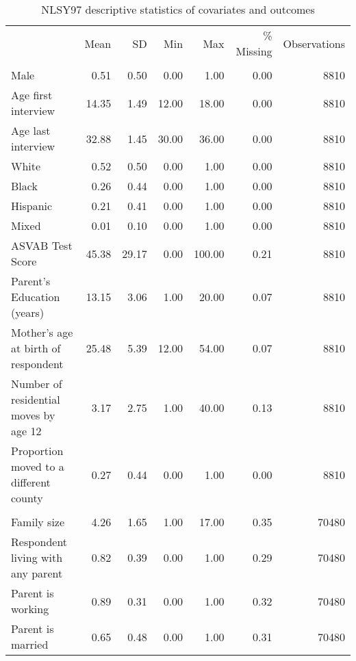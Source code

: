 \begin{table}[htp]
\scriptsize
\setlength{\tabcolsep}{10pt}
\renewcommand{\arraystretch}{0.8}
\begin{threeparttable}
\centering
\caption{NLSY97 descriptive statistics of covariates and outcomes} 
\label{tab:nlsy97_descriptives}
\begin{tabular}{lrrrrrr}
  \hline
\addlinespace
& Mean & SD & Min & Max & \% Missing & Observations \\
\addlinespace
 \hline
  \addlinespace
\multicolumn{7}{l}{\textit{Time-invariant covariates}} \\
\addlinespace
\quad Male & 0.51 & 0.50 & 0.00 & 1.00 & 0.00 & 8810 \\ 
  \quad Age first interview & 14.35 & 1.49 & 12.00 & 18.00 & 0.00 & 8810 \\ 
  \quad Age last interview & 32.88 & 1.45 & 30.00 & 36.00 & 0.00 & 8810 \\ 
  \quad White & 0.52 & 0.50 & 0.00 & 1.00 & 0.00 & 8810 \\ 
  \quad Black & 0.26 & 0.44 & 0.00 & 1.00 & 0.00 & 8810 \\ 
  \quad Hispanic & 0.21 & 0.41 & 0.00 & 1.00 & 0.00 & 8810 \\ 
  \quad Mixed & 0.01 & 0.10 & 0.00 & 1.00 & 0.00 & 8810 \\ 
  \quad ASVAB Test Score & 45.38 & 29.17 & 0.00 & 100.00 & 0.21 & 8810 \\ 
  \quad Parent's Education (years) & 13.15 & 3.06 & 1.00 & 20.00 & 0.07 & 8810 \\ 
  \quad Mother's age at birth of respondent & 25.48 & 5.39 & 12.00 & 54.00 & 0.07 & 8810 \\ 
  \quad Number of residential moves by age 12 & 3.17 & 2.75 & 1.00 & 40.00 & 0.13 & 8810 \\ 
  \quad Proportion moved to a different county & 0.27 & 0.44 & 0.00 & 1.00 & 0.00 & 8810 \\ 
   \addlinespace
\multicolumn{7}{l}{\textit{Time-variant covariates}} \\
\addlinespace
\quad Family size & 4.26 & 1.65 & 1.00 & 17.00 & 0.35 & 70480 \\ 
  \quad Respondent living with any parent & 0.82 & 0.39 & 0.00 & 1.00 & 0.29 & 70480 \\ 
  \quad Parent is working & 0.89 & 0.31 & 0.00 & 1.00 & 0.32 & 70480 \\ 
  \quad Parent is married & 0.65 & 0.48 & 0.00 & 1.00 & 0.31 & 70480 \\ 

\end{tabular}
\end{threeparttable}
\end{table}
